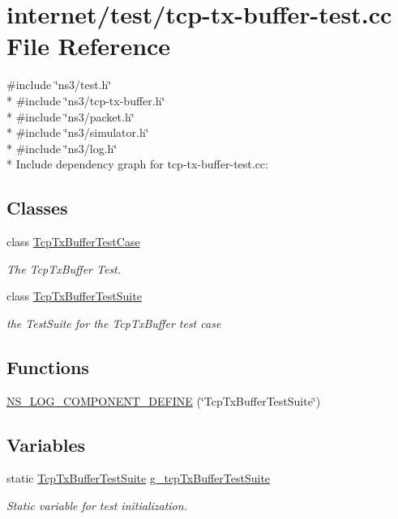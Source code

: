\hypertarget{tcp-tx-buffer-test_8cc}{}\section{internet/test/tcp-\/tx-\/buffer-\/test.cc File Reference}
\label{tcp-tx-buffer-test_8cc}
{\ttfamily \#include \char`\"{}ns3/test.\+h\char`\"{}}\\*
{\ttfamily \#include \char`\"{}ns3/tcp-\/tx-\/buffer.\+h\char`\"{}}\\*
{\ttfamily \#include \char`\"{}ns3/packet.\+h\char`\"{}}\\*
{\ttfamily \#include \char`\"{}ns3/simulator.\+h\char`\"{}}\\*
{\ttfamily \#include \char`\"{}ns3/log.\+h\char`\"{}}\\*
Include dependency graph for tcp-\/tx-\/buffer-\/test.cc\+:
\subsection*{Classes}
\begin{DoxyCompactItemize}
\item 
class \hyperlink{classTcpTxBufferTestCase}{Tcp\+Tx\+Buffer\+Test\+Case}
\begin{DoxyCompactList}\small\item\em The Tcp\+Tx\+Buffer Test. \end{DoxyCompactList}\item 
class \hyperlink{classTcpTxBufferTestSuite}{Tcp\+Tx\+Buffer\+Test\+Suite}
\begin{DoxyCompactList}\small\item\em the Test\+Suite for the Tcp\+Tx\+Buffer test case \end{DoxyCompactList}\end{DoxyCompactItemize}
\subsection*{Functions}
\begin{DoxyCompactItemize}
\item 
\hyperlink{tcp-tx-buffer-test_8cc_a3cbb0372a6da969a77b47c2eb85bf229}{N\+S\+\_\+\+L\+O\+G\+\_\+\+C\+O\+M\+P\+O\+N\+E\+N\+T\+\_\+\+D\+E\+F\+I\+NE} (\char`\"{}Tcp\+Tx\+Buffer\+Test\+Suite\char`\"{})
\end{DoxyCompactItemize}
\subsection*{Variables}
\begin{DoxyCompactItemize}
\item 
static \hyperlink{classTcpTxBufferTestSuite}{Tcp\+Tx\+Buffer\+Test\+Suite} \hyperlink{tcp-tx-buffer-test_8cc_ae516008c9ff6b7216ea5b92fa712d551}{g\+\_\+tcp\+Tx\+Buffer\+Test\+Suite}
\begin{DoxyCompactList}\small\item\em Static variable for test initialization. \end{DoxyCompactList}\end{DoxyCompactItemize}


